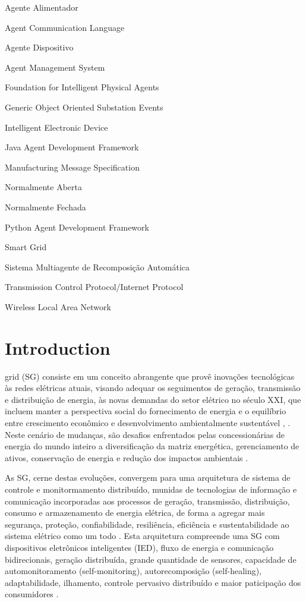 \documentclass[journal]{IEEEtran}
\begin{document}
\begin{description}
  \item[AA] Agente Alimentador
  \item[ACL] Agent Communication Language
  \item[AD] Agente Dispositivo
  \item[AMS] Agent Management System
  \item[FIPA] Foundation for Intelligent Physical Agents
  \item[GOOSE] Generic Object Oriented Substation Events
  \item[IED] Intelligent Electronic Device
  \item[JADE] Java Agent Development Framework
  \item[MMS] Manufacturing Message Specification
  \item[NA] Normalmente Aberta
  \item[NF] Normalmente Fechada 
  \item[PADE] Python Agent Development Framework
  \item[SG] Smart Grid
  \item[SMRA] Sistema Multiagente de Recomposição Automática
  \item[TCP/IP] Transmission Control Protocol/Internet Protocol
  \item[WLAN] Wireless Local Area Network
\end{description}

\section{Introduction}

 grid (SG) consiste em um conceito abrangente que provê inovações tecnológicas às redes elétricas atuais, visando adequar os seguimentos de geração, transmissão e distribuição de energia, às novas demandas do setor elétrico no século XXI, que incluem manter a perspectiva social do fornecimento de energia e o equilíbrio entre crescimento econômico e desenvolvimento ambientalmente sustentável \cite{ref:1}, \cite{ref:2}. Neste cenário de mudanças, são desafios enfrentados pelas concessionárias de energia do mundo inteiro a diversificação da matriz energética, gerenciamento de ativos, conservação de energia e redução dos impactos ambientais \cite{ref:3}.

As SG, cerne destas evoluções, convergem para uma arquitetura de sistema de controle e monitormamento distribuído, munidas de tecnologias de informação e comunicação incorporadas aos processos de geração, transmissão, distribuição, consumo e armazenamento de energia elétrica, de forma a agregar mais segurança, proteção, confiabilidade, resiliência, eficiência e sustentabilidade ao sistema elétrico como um todo \cite{ref:3}. Esta arquitetura compreende uma SG com dispositivos eletrônicos inteligentes (IED), fluxo de energia e comunicação bidirecionais, geração distribuída, grande quantidade de sensores, capacidade de automonitoramento (self-monitoring), autorecomposição (self-healing), adaptabilidade, ilhamento, controle pervasivo distribuído e maior paticipação dos consumidores \cite{ref:3, ref:4, ref:5}.
\end{document}
